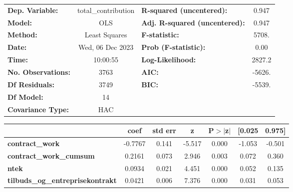 \begin{center}
\begin{tabular}{lclc}
\toprule
\textbf{Dep. Variable:}                     & total\_contribution & \textbf{  R-squared (uncentered):}      &     0.947   \\
\textbf{Model:}                             &         OLS         & \textbf{  Adj. R-squared (uncentered):} &     0.947   \\
\textbf{Method:}                            &    Least Squares    & \textbf{  F-statistic:       }          &     5708.   \\
\textbf{Date:}                              &   Wed, 06 Dec 2023  & \textbf{  Prob (F-statistic):}          &     0.00    \\
\textbf{Time:}                              &       10:00:55      & \textbf{  Log-Likelihood:    }          &    2827.2   \\
\textbf{No. Observations:}                  &          3763       & \textbf{  AIC:               }          &    -5626.   \\
\textbf{Df Residuals:}                      &          3749       & \textbf{  BIC:               }          &    -5539.   \\
\textbf{Df Model:}                          &            14       & \textbf{                     }          &             \\
\textbf{Covariance Type:}                   &         HAC         & \textbf{                     }          &             \\
\bottomrule
\end{tabular}
\begin{tabular}{lcccccc}
                                            & \textbf{coef} & \textbf{std err} & \textbf{z} & \textbf{P$> |$z$|$} & \textbf{[0.025} & \textbf{0.975]}  \\
\midrule
\textbf{contract\_work}                     &      -0.7767  &        0.141     &    -5.517  &         0.000        &       -1.053    &       -0.501     \\
\textbf{contract\_work\_cumsum}             &       0.2161  &        0.073     &     2.946  &         0.003        &        0.072    &        0.360     \\
\textbf{ntek}                               &       0.0934  &        0.021     &     4.451  &         0.000        &        0.052    &        0.135     \\
\textbf{tilbuds\_og\_entreprisekontrakt}    &       0.0421  &        0.006     &     7.376  &         0.000        &        0.031    &        0.053     \\

\end{tabular}
\end{center}
